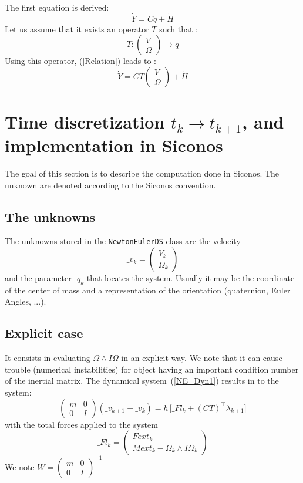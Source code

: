 The first equation is derived:
\[\dot Y = C \dot q + \dot H\]
Let us assume that it exists an operator $T$ such that :
\[T:  \left(\begin{array}{l} V\\ \Omega\end{array}\right) \to \dot q \]
Using  this operator, (\ref{Relation}) leads to :
\[\dot Y = C T \left(\begin{array}{l} V\\ \Omega\end{array}\right) + \dot H\]

\section{Time discretization $t_k \to t_{k+1}$, and implementation in Siconos}
The goal of this section is to describe the computation done in Siconos. The unknown are denoted according to the Siconos convention.
\subsection{The unknowns}

The unknowns stored in the \texttt{NewtonEulerDS} class are the velocity
\[\_v_{k}=\left(\begin{array}{c} V_k\\ \Omega _{k}\end{array}\right)\]
and  the parameter $\_q_{k}$ that locates the system. Usually it may be the coordinate of the center of mass and a representation of the orientation (quaternion, Euler Angles, ...).

\subsection{Explicit case}
It consists in evaluating $\Omega  \wedge I\Omega $ in an explicit way. We note that it can cause trouble (numerical instabilities) for object having an important condition number of the inertial matrix.
The dynamical system~(\ref{NE_Dyn1}) results in to the system:
\begin{equation}
  \left(\begin{array}{cc} m&0\\0&I\end{array}\right)
   (\_v_{k+1}-\_v_{k})=
   h\, \big[\_Fl_k +
    (CT)^\top \lambda _{k+1}\big]
  \end{equation}
  with the total forces applied to the system \[\_Fl_k = \left(\begin{array}{c} Fext_k\\ Mext_k - \Omega _k \wedge I\Omega _k \end{array}\right)\]
We note $W = \left(\begin{array}{cc} m&0\\0&I\end{array}\right) ^{-1} $

